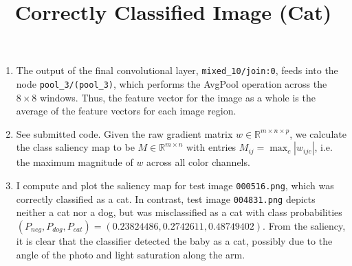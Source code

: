 \documentclass[12pt]{article}
\begin{document}
\begin{enumerate}
\begin{figure}[H]
	\end{figure}
	\item The output of the final convolutional layer, \verb|mixed_10/join:0|, feeds into the node \verb|pool_3/(pool_3)|, which performs the AvgPool operation across the $8 \times 8$ windows. Thus, the feature vector for the image as a whole is the average of the feature vectors for each image region.
	\item See submitted code. Given the raw gradient matrix $w \in \mathbb{R}^{m \times n \times p}$, we calculate the class saliency map to be $M \in \mathbb{R}^{m \times n}$ with entries $M_{ij} = \max_c |w_{ijc}|$, i.e. the maximum magnitude of $w$ across all color channels.
	\item I compute and plot the saliency map for test image \verb|000516.png|, which was correctly classified as a cat. In contrast, test image \verb|004831.png| depicts neither a cat nor a dog, but was misclassified as a cat with class probabilities $(P_{neg}, P_{dog}, P_{cat}) = (0.23824486, 0.2742611, 0.48749402)$. From the saliency, it is clear that the classifier detected the baby as a cat, possibly due to the angle of the photo and light saturation along the arm.
	\begin{figure}[H]
		\centering
		\title{\bf Correctly Classified Image (Cat)}
		\\ \vspace{2.5mm}

\end{figure}
\end{enumerate}
\end{document}
